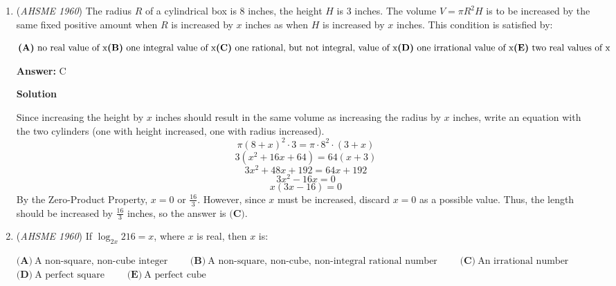\begin{enumerate}
 \textbf{Answer: }A



\textbf{Solution}

Expand binomials, combine like terms, and subtract terms from both sides.
 \[x^2 + 2xm + m^2 - x^2 - 2xn - n^2 = m^2 - 2mn + n^2\]
 \[2xm + m^2 - 2xn - n^2 = m^2 - 2mn + n^2\]
 \[2xm - 2xn - n^2 = -2mn + n^2\]Get all the x-terms on one side and factor to solve for x.
 \[2xm - 2xn = -2mn + 2n^2\]
 \[2x(m-n) = -2n(m-n)\]Since $m \not= n$, both sides can be divided by $m-n$.
 \[x = -n\]That means $a = 0$ and $b = -1$, so the answer is $\boxed{\textbf{(A)}}$.

 


	\item (\textit{AHSME 1960}) The radius $R$ of a cylindrical box is $8$ inches, the height $H$ is $3$ inches. 
The volume $V = \pi R^2H$ is to be increased by the same fixed positive amount when $R$ 
is increased by $x$ inches as when $H$ is increased by $x$ inches. This condition is satisfied by:


 $\textbf{(A)}\ \text{no real value of x} \qquad \\ \textbf{(B)}\ \text{one integral value of x} \qquad \\ \textbf{(C)}\ \text{one rational, but not integral, value of x} \qquad \\ \textbf{(D)}\ \text{one irrational value of x}\qquad \\ \textbf{(E)}\ \text{two real values of x}$

 \textbf{Answer: }C



\textbf{Solution}

Since increasing the height by $x$ inches should result in the same volume as increasing the radius by $x$ inches, write an equation with the two cylinders (one with height increased, one with radius increased).
 \[\pi (8+x)^2 \cdot 3 = \pi \cdot 8^2 \cdot (3+x)\]
 \[3(x^2+16x+64) = 64(x+3)\]
 \[3x^2+48x+192=64x+192\]
 \[3x^2-16x=0\]
 \[x(3x-16)=0\]By the Zero-Product Property, $x = 0$ or $\frac{16}{3}$.  However, since $x$ must be increased, discard $x = 0$ as a possible value.  Thus, the length should be increased by $\frac{16}{3}$ inches, so the answer is $\boxed{\textbf{(C)}}$.

 


	\item (\textit{AHSME 1960}) If $\log_{2x}216 = x$, where $x$ is real, then $x$ is:


 $\textbf{(A)}\ \text{A non-square, non-cube integer}\qquad$
$\textbf{(B)}\ \text{A non-square, non-cube, non-integral rational number}\qquad$
$\textbf{(C)}\ \text{An irrational number}\qquad$
$\textbf{(D)}\ \text{A perfect square}\qquad$
$\textbf{(E)}\ \text{A perfect cube}$


\end{enumerate}

